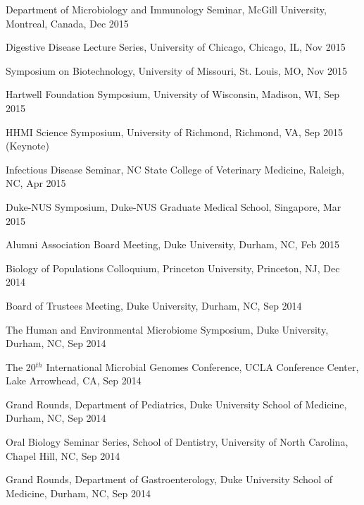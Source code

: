 \documentclass[overlapped,line,11pt]{res}
\begin{document}
\begin{resume}
\begin{revnumerate}[57]
\item {Department of Microbiology and Immunology Seminar, McGill University, Montreal, Canada, Dec 2015}

\item {Digestive Disease Lecture Series, University of Chicago, Chicago, IL, Nov 2015}

\item {Symposium on Biotechnology, University of Missouri, St. Louis, MO, Nov 2015}

\item {Hartwell Foundation Symposium, University of Wisconsin, Madison, WI, Sep 2015}

\item {HHMI Science Symposium, University of Richmond, Richmond, VA, Sep 2015 (Keynote)}

\item {Infectious Disease Seminar, NC State College of Veterinary Medicine, Raleigh, NC, Apr 2015}

\item {Duke-NUS Symposium, Duke-NUS Graduate Medical School, Singapore, Mar 2015}

\item {Alumni Association Board Meeting, Duke University,
  Durham, NC, Feb 2015
  }

\item {Biology of Populations Colloquium, Princeton University, Princeton, NJ, Dec 2014
  }

\item {Board of Trustees Meeting, Duke University,
  Durham, NC, Sep 2014
  }

\item { The Human and Environmental Microbiome Symposium, Duke University,
  Durham, NC, Sep 2014
  }

\item {The 20$^{th}$ International Microbial Genomes Conference, UCLA
  Conference Center, Lake Arrowhead, CA, Sep 2014
  }

\item {Grand Rounds, Department of Pediatrics, Duke University School of
  Medicine, Durham, NC, Sep 2014
  }

\item {Oral Biology Seminar Series, School of Dentistry, University of
  North Carolina, Chapel Hill, NC, Sep 2014
  }

\item {Grand Rounds, Department of Gastroenterology, Duke University School of
  Medicine, Durham, NC, Sep 2014
  }


\end{revnumerate}
\end{resume}
\end{document}
